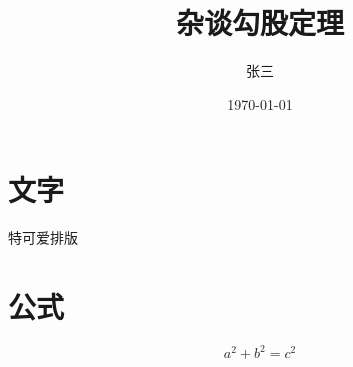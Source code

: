 \documentclass[UTF8]{ctexart}
\title{杂谈勾股定理}
\author{张三}
\date{\today}
\begin{document}
\maketitle

\section{文字}\label{sec:text}
特可爱排版

\section{公式}
\[
    a^2 + b^2 = c^2
\]
\end{document}

